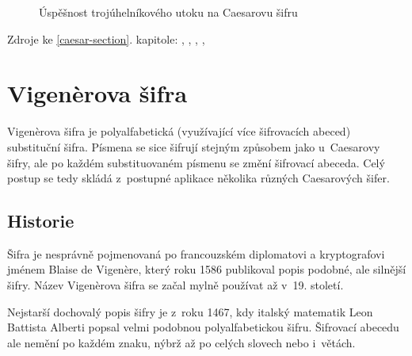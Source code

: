 \documentclass[glossaries, index]{kidiplom}
\begin{document}
\begin{figure}[htbp]
\centering
{}
\caption{Úspěšnost trojúhelníkového utoku na Caesarovu šifru}
\end{figure}

\vspace*{\fill}

\noindent
Zdroje ke \ref{caesar-section}. kapitole: \cite{singh2009}, \cite{stinson2006}, \cite{caesarwiki}, \cite{caesarwiki-en}, \cite{letterfrequencywiki}

\newpage


\section{Vigenèrova šifra}
\label{vigenere-section}
Vigenèrova šifra je polyalfabetická (využívající více šifrovacích abeced) substituční šifra. Písmena se sice šifrují stejným způsobem jako u~Caesarovy šifry, ale po každém substituovaném písmenu se změní šifrovací abeceda. Celý postup se tedy skládá z~postupné aplikace několika různých Caesarových šifer.

\subsection{Historie}
Šifra je nesprávně pojmenovaná po francouzském diplomatovi a kryptografovi jménem Blaise de Vigenère, který roku 1586 publikoval popis podobné, ale silnější šifry. Název Vigenèrova šifra se začal mylně používat až v~19. století.

Nejstarší dochovalý popis šifry je z~roku 1467, kdy italský matematik Leon Battista Alberti popsal velmi podobnou polyalfabetickou šifru. Šifrovací abecedu ale nemění po každém znaku, nýbrž až po celých slovech nebo i~větách. 
\end{document}
